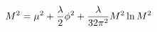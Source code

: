 \begin{equation}
\label{tredici}
M^2=  \mu ^2 + {\lambda \over 2} \phi ^2  + {\lambda \over 32 \pi ^ 2} M^2 \ln {M^2}
\end{equation}


